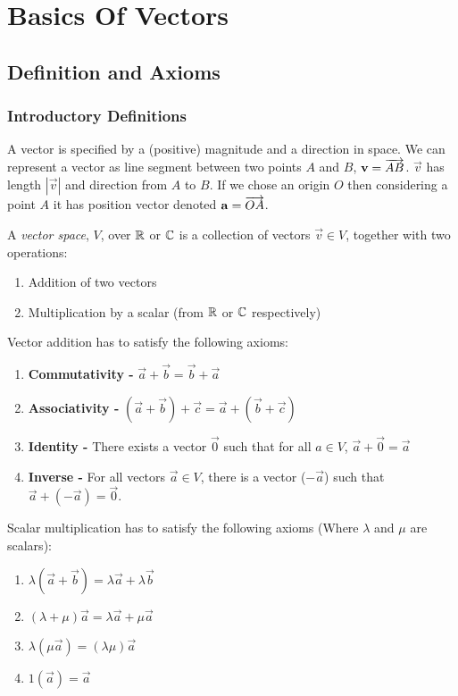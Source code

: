 \documentclass[../main.tex]{subfiles}
\begin{document}
\chapter{Basics Of Vectors}
\section{Definition and Axioms}
\subsection{Introductory Definitions}
A vector is specified by a (positive) magnitude and a direction in space.
We can represent a vector as line segment between two points $A$ and $B$, $\boldsymbol{\mathbf{v}} = \overrightarrow{AB}$.
$\vec{v}$ has length $|\vec{v}|$ and direction from $A$ to $B$.
If we chose an origin $O$ then considering a point $A$ it has position vector denoted $\boldsymbol{\mathbf{a}} = \overrightarrow{OA}$.
\begin{definition}
  A \textit{vector space}, $V$, over $\mathbb{R}$ or $\mathbb{C}$ is a collection of vectors $\vec{v} \in V$, together with two operations:
  \begin{enumerate}
    \item Addition of two vectors
    \item Multiplication by a scalar (from $\mathbb{R}$ or $\mathbb{C}$ respectively)
  \end{enumerate}
\end{definition}
Vector addition has to satisfy the following axioms:
\begin{enumerate}
  \item \textbf{Commutativity -} $\vec{a} + \vec{b} = \vec{b} + \vec{a}$
  \item \textbf{Associativity -} $(\vec{a} + \vec{b}) + \vec{c} = \vec{a} + (\vec{b} + \vec{c})$
  \item \textbf{Identity -} There exists a vector $\vec{0}$ such that for all $a \in V$, $\vec{a} + \vec{0} = \vec{a}$
  \item \textbf{Inverse -} For all vectors $\vec{a} \in V$, there is a vector ($-\vec{a}$) such that $\vec{a} + (-\vec{a}) = \vec{0}$.
\end{enumerate}
Scalar multiplication has to satisfy the following axioms (Where $\lambda$ and $\mu$ are scalars):
\begin{enumerate}
  \item $\lambda(\vec{a} + \vec{b}) = \lambda \vec{a} + \lambda \vec{b}$
  \item $(\lambda + \mu)\vec{a} = \lambda \vec{a} + \mu \vec{a}$
  \item $\lambda(\mu \vec{a}) = (\lambda \mu)\vec{a}$
  \item $1(\vec{a}) = \vec{a}$
\end{enumerate}
\end{document}
